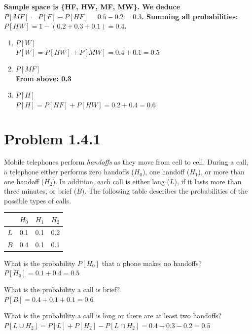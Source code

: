 \documentclass{article}
\begin{document}
\vspace{1em}
{\boldmath\textbf{Sample space is \{HF, HW, MF, MW\}.
We deduce $P[MF] = P[F] - P[HF] = 0.5 - 0.2 = 0.3$.
Summing all probabilities: $P[HW] = 1 - (0.2 + 0.3 + 0.1) = 0.4$.}}

\begin{enumerate}[label=(\alph*)]
    \item $P[W]$ \\[1em]
    {\boldmath\textbf{$P[W] = P[HW] + P[MW] = 0.4 + 0.1 = 0.5$}}
    
    \item $P[MF]$ \\[1em]
    {\boldmath\textbf{From above: 0.3}}
    
    \item $P[H]$ \\[1em]
    {\boldmath\textbf{$P[H] = P[HF] + P[HW] = 0.2 + 0.4 = 0.6$}}
\end{enumerate}

\newpage

\section*{Problem 1.4.1}
Mobile telephones perform \textit{handoffs} as they move from cell to cell. During a call, a telephone either performs zero handoffs ($H_0$), one handoff ($H_1$), or more than one handoff ($H_2$). In addition, each call is either long ($L$), if it lasts more than three minutes, or brief ($B$). The following table describes the probabilities of the possible types of calls.

\begin{center}
\begin{tabular}{c|ccc}
 & $H_0$ & $H_1$ & $H_2$ \\
\hline
$L$ & 0.1 & 0.1 & 0.2 \\
$B$ & 0.4 & 0.1 & 0.1
\end{tabular}
\end{center}

\noindent
\noindent
What is the probability $P[H_0]$ that a phone makes no handoffs? \\[1em]
{\boldmath\textbf{$P[H_0] = 0.1 + 0.4 = 0.5$}}

\noindent
What is the probability a call is brief? \\[1em]
{\boldmath\textbf{$P[B] = 0.4 + 0.1 + 0.1 = 0.6$}}

\noindent
What is the probability a call is long or there are at least two handoffs? \\[1em]
{\boldmath\textbf{$P[L \cup H_2] = P[L] + P[H_2] - P[L \cap H_2] = 0.4 + 0.3 - 0.2 = 0.5$}}
\end{document}
